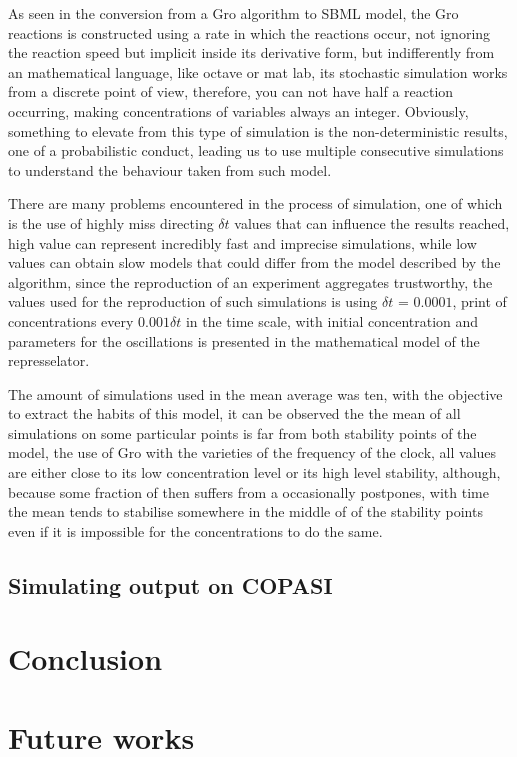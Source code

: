 \documentclass[12pt]{article}
\begin{document}
As seen in the conversion from a Gro algorithm to SBML model, the Gro reactions is constructed using a rate in which the reactions occur, not ignoring the reaction speed but implicit inside its derivative form, but indifferently from an mathematical language, like octave or mat lab, its stochastic simulation works from a discrete point of view, therefore, you can not have half a reaction occurring, making concentrations of variables always an integer. Obviously, something to elevate from this type of simulation is the non-deterministic results, one of a probabilistic conduct, leading us to use multiple consecutive simulations to understand the behaviour taken from such model.

There are many problems encountered in the process of simulation, one of which is the use of highly miss directing $\delta{t}$ values that can influence the results reached, high value can represent incredibly fast and imprecise simulations, while low values can obtain slow models that could differ from the model described by the algorithm, since the reproduction of an experiment aggregates trustworthy, the values used for the reproduction of such simulations is using $\delta{t}$ = $0.0001$, print of concentrations every $0.001\delta{t}$ in the time scale, with initial concentration and parameters for the oscillations is presented in the mathematical model of the represselator.

The amount of simulations used in the mean average was ten, with the objective to extract the habits of this model, it can be observed the the mean of all simulations on some particular points is far from both stability points of the model, the use of Gro with the varieties of the frequency of the clock, all values are either close to its low concentration level or its high level stability, although, because some fraction of then suffers from a occasionally postpones, with time the mean tends to stabilise somewhere in the middle of of the stability points even if it is impossible for the concentrations to do the same.

\subsection{Simulating output on COPASI}
    \lipsum[1]

\section{Conclusion}
    \lipsum[1]
    
\section{Future works}
    \lipsum[1]



\end{document}
